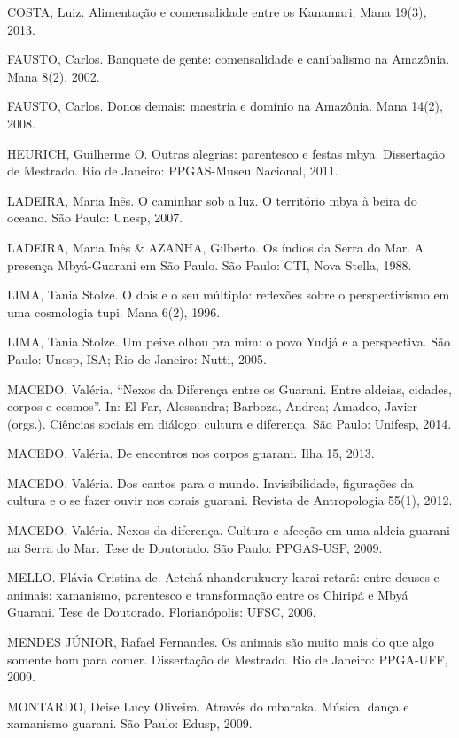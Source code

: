 \documentclass{article}
\begin{document}
COSTA, Luiz. Alimenta\c{c}\~ao e comensalidade entre os Kanamari. Mana
19(3), 2013.

FAUSTO, Carlos. Banquete de gente: comensalidade e canibalismo na
Amaz\^onia. Mana 8(2), 2002.

FAUSTO, Carlos. Donos demais: maestria e dom\'inio na Amaz\^onia. Mana
14(2), 2008.

HEURICH, Guilherme O. Outras alegrias: parentesco e festas mbya.
Disserta\c{c}\~ao de Mestrado. Rio de Janeiro: PPGAS-Museu Nacional,
2011.

LADEIRA, Maria In\^es. O caminhar sob a luz. O territ\'orio mbya \`a
beira do oceano. S\~ao Paulo: Unesp, 2007.

LADEIRA, Maria In\^es \& AZANHA, Gilberto. Os \'indios da Serra do Mar.
A presen\c{c}a Mby\'a-Guarani em S\~ao Paulo. S\~ao Paulo: CTI, Nova
Stella, 1988.

LIMA, Tania Stolze. O dois e o seu m\'ultiplo: reflex\~oes sobre o
perspectivismo em uma cosmologia tupi. Mana 6(2), 1996.

LIMA, Tania Stolze. Um peixe olhou pra mim: o povo Yudj\'a e a
perspectiva. S\~ao Paulo: Unesp, ISA; Rio de Janeiro: Nutti, 2005.

MACEDO, Val\'eria. {\textquotedblleft}Nexos da Diferen\c{c}a entre os
Guarani. Entre aldeias, cidades, corpos e cosmos{\textquotedblright}.
In: El Far, Alessandra; Barboza, Andrea; Amadeo, Javier (orgs.).
Ci\^encias sociais em di\'alogo: cultura e diferen\c{c}a. S\~ao Paulo:
Unifesp, 2014.

MACEDO, Val\'eria. De encontros nos corpos guarani. Ilha 15, 2013.

MACEDO, Val\'eria. Dos cantos para o mundo. Invisibilidade,
figura\c{c}\~oes da cultura e o se fazer ouvir nos corais guarani.
Revista de Antropologia 55(1), 2012.

MACEDO, Val\'eria. Nexos da diferen\c{c}a. Cultura e afec\c{c}\~ao em
uma aldeia guarani na Serra do Mar. Tese de Doutorado. S\~ao Paulo:
PPGAS-USP, 2009.

MELLO. Fl\'avia Cristina de. Aetch\'a nhanderukuery karai retar\~a:
entre deuses e animais: xamanismo, parentesco e transforma\c{c}\~ao
entre os Chirip\'a e Mby\'a Guarani. Tese de Doutorado.
Florian\'opolis: UFSC, 2006.

MENDES J\'UNIOR, Rafael Fernandes. Os animais s\~ao muito mais do que
algo somente bom para comer. Disserta\c{c}\~ao de Mestrado. Rio de
Janeiro: PPGA-UFF, 2009.

MONTARDO, Deise Lucy Oliveira. Atrav\'es do mbaraka. M\'usica, dan\c{c}a
e xamanismo guarani. S\~ao Paulo: Edusp, 2009.
\end{document}
